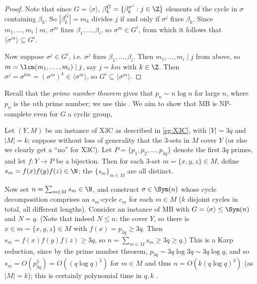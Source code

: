 \begin{proof}
    Note that since $G = \langle \sigma \rangle$,  $\beta_k^G = \{\beta_k^{\sigma^j} : j \in \Z\}$  elements of the cycle in $\sigma$ containing $\beta_k$. So $|\beta_k^G| = m_k$ divides $j$ if and only if $\sigma^j$ fixes $\beta_k$. Since $m_1,\dotsc,m_i \mid m$,  $\sigma^m$ fixes $\beta_1,\dotsc,\beta_i$, so $\sigma^m \in G^i$, from which it follows that $\langle \sigma^m \rangle \subseteq G^i$.

    Now suppose $\sigma^j \in G^i$, i.e. $\sigma^j$ fixes $\beta_1,\dotsc,\beta_i$. Then $m_1,\dotsc,m_i \mid j$ from above, so $m = \lcm(m_1,\dotsc,m_i) \mid j$, say $j = km$ with $k \in \Z$. Then $\sigma^j = \sigma^{km} = (\sigma^m)^k \in \langle \sigma^m \rangle$, so $G^i \subseteq \langle \sigma^m \rangle$.
\end{proof}

Recall that the \textit{prime number theorem} gives that $p_n \sim n\log n$ for large $n$, where $p_n$ is the $n$th prime number; we use this . We aim to show that MB is NP-complete even for $G$ a cyclic group, 

Let $(Y,M)$ be an instance of X3C as described in \autoref{eg:X3C}, with $|Y| = 3q$ and $|M| = k$; suppose without loss of generality that the 3-sets in $M$ cover $Y$ (or else we clearly get a ``no'' for X3C). Let $P = \{p_1,p_2,\dotsc,p_{3q}\}$ denote the first $3q$ primes, and let $f : Y \to P$ be a bijection. Then for each 3-set $m = \{x,y,z\} \in M$, define $s_m = f(x)f(y)f(z) \in \N$; the $\{s_m\}_{m \in M}$ are all distinct.

Now set $n = \sum_{m \in M} s_m \in \N$, and construct $\sigma \in \Sym(n)$ whose cycle decomposition comprises an $s_m$-cycle $c_m$ for each $m \in M$ ($k$ disjoint cycles in total, all different lengths). Consider an instance of MB with $G = \langle \sigma \rangle \leq \Sym(n)$ and $N = q$. (Note that indeed $N \leq n$: the  cover $Y$, so there is $x \in m = \{x,y,z\} \in M$ with $f(x) = p_{3q} \geq 3q$. Then $s_m = f(x)f(y)f(z) \geq 3q$, so $n = \sum_{m \in M} s_m \geq 3q \geq q$.) This is a Karp reduction, since by the prime number theorem, $p_{3q} \sim 3q\log 3q \sim 3q\log q$, and so $s_m = O(p_{3q}^3) = O((q\log q)^3)$ for $m \in M$ and thus $n = O(k(q\log q)^3)$ (as $|M| = k$); this is certainly polynomial time in $q,k$ .

